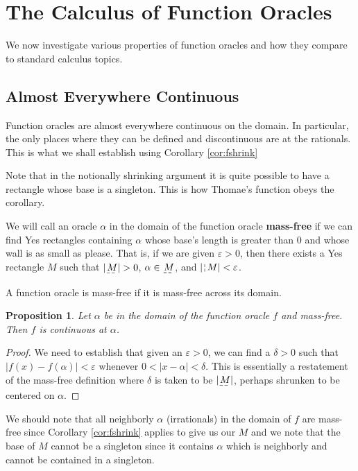 \documentclass[12pt]{article}
\newtheorem{proposition}{Proposition}[section]
\begin{document}
\section{The Calculus of Function Oracles}

We now investigate various properties of function oracles and how they compare to standard calculus topics. 

\subsection{Almost Everywhere Continuous}

Function oracles are almost everywhere continuous on the domain. In particular, the only places where they can be defined and discontinuous are at the rationals. This is what we shall establish using Corollary \ref{cor:fshrink}

Note that in the notionally shrinking argument it is quite possible to have a rectangle whose base is a singleton. This is how Thomae's function obeys the corollary. 

We will call an oracle $\alpha$ in the domain of the function oracle \textbf{mass-free} if we can find Yes rectangles containing $\alpha$ whose base's length is greater than 0 and whose wall is as small as please. That is, if we are given $\varepsilon > 0$, then there exists a Yes rectangle $M$ such that $|\base{M}| > 0$, $\alpha \in \base{M}$, and $|\wall{M}| < \varepsilon$.
 
 A function oracle is mass-free if it is mass-free across its domain.  

\begin{proposition}
Let $\alpha$ be in the domain of the function oracle $f$ and mass-free. Then $f$ is continuous at $\alpha$.
\end{proposition}

\begin{proof}
    We need to establish that given an $\varepsilon > 0$, we can find a $\delta > 0$ such that $|f(x) - f(\alpha)| < \varepsilon$ whenever $0 < |x - \alpha| < \delta$. This is essentially a restatement of the mass-free definition where $\delta$ is taken to be $|\base{M}|$, perhaps shrunken to be centered on $\alpha$. 
\end{proof}

We should note that all neighborly $\alpha$ (irrationals) in the domain of $f$ are mass-free since Corollary \ref{cor:fshrink} applies to give us our $M$ and we note that the base of $M$ cannot be a singleton since it contains $\alpha$ which is neighborly and cannot be contained in a singleton.
\end{document}
